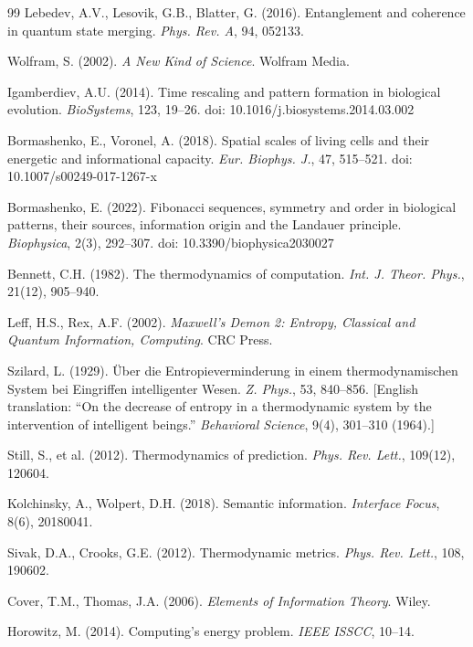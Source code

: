 \documentclass[12pt]{article}
\numberwithin{equation}{section}
\begin{document}
\begin{thebibliography}{99}
Lebedev, A.V., Lesovik, G.B., Blatter, G. (2016). Entanglement and coherence in quantum state merging. \textit{Phys. Rev. A}, 94, 052133.

Wolfram, S. (2002). \textit{A New Kind of Science}. Wolfram Media.

Igamberdiev, A.U. (2014). Time rescaling and pattern formation in biological evolution. \textit{BioSystems}, 123, 19--26. doi: 10.1016/j.biosystems.2014.03.002

Bormashenko, E., Voronel, A. (2018). Spatial scales of living cells and their energetic and informational capacity. \textit{Eur. Biophys. J.}, 47, 515--521. doi: 10.1007/s00249-017-1267-x

Bormashenko, E. (2022). Fibonacci sequences, symmetry and order in biological patterns, their sources, information origin and the Landauer principle. \textit{Biophysica}, 2(3), 292--307. doi: 10.3390/biophysica2030027

Bennett, C.H. (1982). The thermodynamics of computation. \textit{Int. J. Theor. Phys.}, 21(12), 905--940.

Leff, H.S., Rex, A.F. (2002). \textit{Maxwell's Demon 2: Entropy, Classical and Quantum Information, Computing}. CRC Press.

Szilard, L. (1929). Über die Entropieverminderung in einem thermodynamischen System bei Eingriffen intelligenter Wesen. \textit{Z. Phys.}, 53, 840--856. [English translation: ``On the decrease of entropy in a thermodynamic system by the intervention of intelligent beings.'' \textit{Behavioral Science}, 9(4), 301--310 (1964).]

Still, S., et al. (2012). Thermodynamics of prediction. \textit{Phys. Rev. Lett.}, 109(12), 120604.

Kolchinsky, A., Wolpert, D.H. (2018). Semantic information. \textit{Interface Focus}, 8(6), 20180041.

Sivak, D.A., Crooks, G.E. (2012). Thermodynamic metrics. \textit{Phys. Rev. Lett.}, 108, 190602.

Cover, T.M., Thomas, J.A. (2006). \textit{Elements of Information Theory}. Wiley.

Horowitz, M. (2014). Computing's energy problem. \textit{IEEE ISSCC}, 10--14.


\end{thebibliography}
\end{document}
